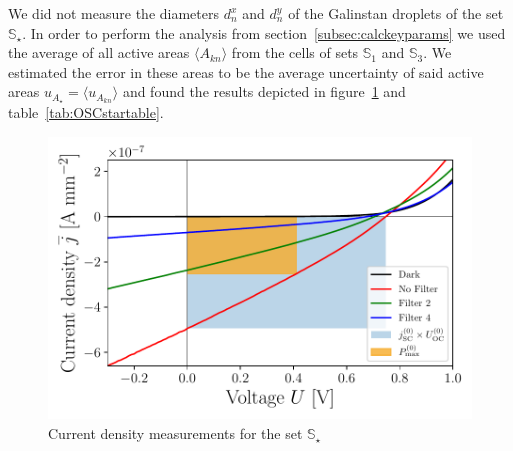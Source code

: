 \documentclass[a4paper,10pt,twocolumn]{article}
\begin{document}
\begin{extract*}
We did not measure the diameters $d_n^x$ and $d_n^y$ of the Galinstan droplets of the set $\mathbb{S}_\star$. In order to perform the analysis from section~\ref{subsec:calckeyparams} we used the average of all active areas $\langle A_{kn} \rangle$ from the cells of sets $\mathbb{S}_1$ and $\mathbb{S}_3$. We estimated the error in these areas to be the average uncertainty of said active areas $u_{A_\star} = \langle u_{A_{kn}}\rangle$ and found the results depicted in figure~\ref{fig:OSCstarGraph} and table~\ref{tab:OSCstartable}.

\begin{figure}[h]\centering
	\includegraphics[width=\columnwidth]{../../../IV-Curve-Analysis/OSCPGraph.pdf}
	\caption{Current density measurements for the set $\mathbb{S}_\star$}
	\label{fig:OSCstarGraph}
\end{figure}


\end{extract*}
\end{document}
